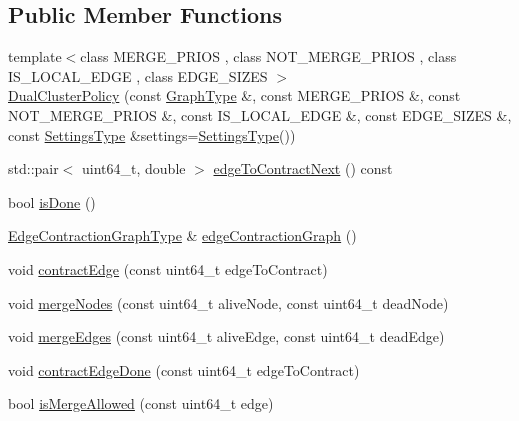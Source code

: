 \subsection*{Public Member Functions}
\begin{DoxyCompactItemize}
\item 
{\footnotesize template$<$class M\+E\+R\+G\+E\+\_\+\+P\+R\+I\+OS , class N\+O\+T\+\_\+\+M\+E\+R\+G\+E\+\_\+\+P\+R\+I\+OS , class I\+S\+\_\+\+L\+O\+C\+A\+L\+\_\+\+E\+D\+GE , class E\+D\+G\+E\+\_\+\+S\+I\+Z\+ES $>$ }\\\hyperlink{classnifty_1_1graph_1_1agglo_1_1DualClusterPolicy_ac52bf8e25834241e96fe1637579ffc1b}{Dual\+Cluster\+Policy} (const \hyperlink{classnifty_1_1graph_1_1agglo_1_1DualClusterPolicy_ad8e19fe87ad08f4187fdb79c1367389a}{Graph\+Type} \&, const M\+E\+R\+G\+E\+\_\+\+P\+R\+I\+OS \&, const N\+O\+T\+\_\+\+M\+E\+R\+G\+E\+\_\+\+P\+R\+I\+OS \&, const I\+S\+\_\+\+L\+O\+C\+A\+L\+\_\+\+E\+D\+GE \&, const E\+D\+G\+E\+\_\+\+S\+I\+Z\+ES \&, const \hyperlink{structnifty_1_1graph_1_1agglo_1_1DualClusterPolicy_1_1SettingsType}{Settings\+Type} \&settings=\hyperlink{structnifty_1_1graph_1_1agglo_1_1DualClusterPolicy_1_1SettingsType}{Settings\+Type}())
\item 
std\+::pair$<$ uint64\+\_\+t, double $>$ \hyperlink{classnifty_1_1graph_1_1agglo_1_1DualClusterPolicy_a71302b486964ff3d8f4c1b73cfbd7eae}{edge\+To\+Contract\+Next} () const
\item 
bool \hyperlink{classnifty_1_1graph_1_1agglo_1_1DualClusterPolicy_a055733fe4b1a2883fc157be44ca116d2}{is\+Done} ()
\item 
\hyperlink{classnifty_1_1graph_1_1agglo_1_1DualClusterPolicy_a50412f31fd3dc355ef0804cb8d753c05}{Edge\+Contraction\+Graph\+Type} \& \hyperlink{classnifty_1_1graph_1_1agglo_1_1DualClusterPolicy_aa08bdfd6a8112f736978ff2025d8d395}{edge\+Contraction\+Graph} ()
\item 
void \hyperlink{classnifty_1_1graph_1_1agglo_1_1DualClusterPolicy_a7e137da249efd061a846fb73a4d642ab}{contract\+Edge} (const uint64\+\_\+t edge\+To\+Contract)
\item 
void \hyperlink{classnifty_1_1graph_1_1agglo_1_1DualClusterPolicy_a8c7aa0c86c9ec848a46dbe547f4a36d1}{merge\+Nodes} (const uint64\+\_\+t alive\+Node, const uint64\+\_\+t dead\+Node)
\item 
void \hyperlink{classnifty_1_1graph_1_1agglo_1_1DualClusterPolicy_a0f986a69135f3b76cf1ffd5852b8d7a0}{merge\+Edges} (const uint64\+\_\+t alive\+Edge, const uint64\+\_\+t dead\+Edge)
\item 
void \hyperlink{classnifty_1_1graph_1_1agglo_1_1DualClusterPolicy_aa151dd026d3773ff06b1f97c54681e15}{contract\+Edge\+Done} (const uint64\+\_\+t edge\+To\+Contract)
\item 
bool \hyperlink{classnifty_1_1graph_1_1agglo_1_1DualClusterPolicy_ac4ede299befaa57d313f0ffe9b27ac16}{is\+Merge\+Allowed} (const uint64\+\_\+t edge)
\end{DoxyCompactItemize}
